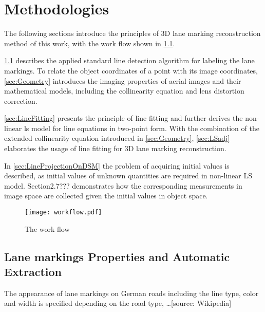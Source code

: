 
\chapter{Methodologies}
\label{chap:k2}

The following sections introduce the principles of 3D lane marking reconstruction method of this work, with the work flow shown in \cref{fig:FlowChart}.

\cref{sec:LineExtraction} describes the applied standard line detection algorithm for labeling the lane markings. To relate the object coordinates of a point with its image coordinates, \cref{sec:Geometry} introduces the imaging properties of aerial images and their mathematical models, including the collinearity equation and lens distortion correction.

\cref{sec:LineFitting} presents the principle of line fitting and further derives the non-linear \gls{ls} model for line equations in two-point form. With the combination of the extended collinearity equation introduced in \cref{sec:Geometry}, \cref{sec:LSadj} elaborates the usage of line fitting for 3D lane marking reconstruction.%

In \cref{sec:LineProjectionOnDSM} the problem of acquiring initial values is described, as initial values of unknown quantities are required in non-linear LS model. Section2.7??? demonstrates how the corresponding measurements in image space are collected given the initial values in object space.

\begin{figure}
  \centering
  \texttt{[image: workflow.pdf]}
  \caption{\small The work flow}
  \label{fig:FlowChart}
\end{figure}

\clearpage


\section{Lane markings Properties and Automatic Extraction}
\label{sec:LineExtraction}
The appearance of lane markings on German roads including the line type, color and width is specified depending on the road type, …[source: Wikipedia]

